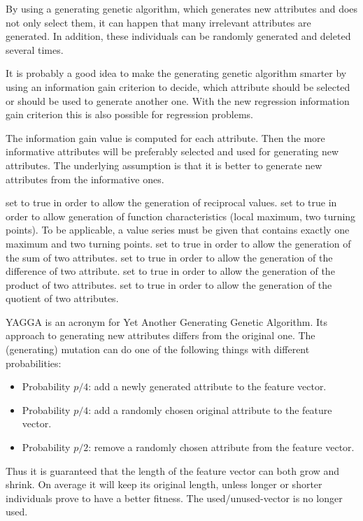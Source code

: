 \opdescr By using a generating genetic algorithm, which generates new
attributes and does not only select them, it can happen that many
irrelevant attributes are generated. In addition, these individuals
can be randomly generated and deleted several times.

It is probably a good idea to make the generating genetic algorithm smarter 
by using an information gain criterion to decide, which
attribute should be selected or should be used to generate another
one. With the new regression information gain criterion this is also 
possible for regression problems.

The information gain value is computed for each attribute. Then the more 
informative attributes will be preferably selected and used for 
generating new attributes. The underlying assumption is that it is 
better to generate new attributes from the informative ones.




\featureoperatorio

\begin{parameters}
\gaparameters
{} set to true in order to allow the generation of
reciprocal values.
 set to true in order to allow generation of
function characteristics (local maximum, two turning points). To be
applicable, a value series must be given that contains exactly one
maximum and two turning points.
 set to true in order to allow the generation of
the sum of two attributes.
 set to true in order to allow the generation of
the difference of two attribute.
 set to true in order to allow the generation of
the product of two attributes.
 set to true in order to allow the generation of
the quotient of two attributes.
\end{parameters}

\opdescr YAGGA is an acronym for Yet Another Generating Genetic
Algorithm. Its approach to generating new attributes differs from the
original one. The (generating) mutation can do one of the following
things with different probabilities:
\begin{itemize}
\item Probability $p/4$: add a newly generated attribute to the feature vector.
\item Probability $p/4$: add a randomly chosen original attribute to the feature vector.
\item Probability $p/2$: remove a randomly chosen attribute from the feature vector.
\end{itemize}
Thus it is guaranteed that the length of the feature vector can both
grow and shrink. On average it will keep its original length, unless
longer or shorter individuals prove to have a better fitness. The
used/unused-vector is no longer used.



